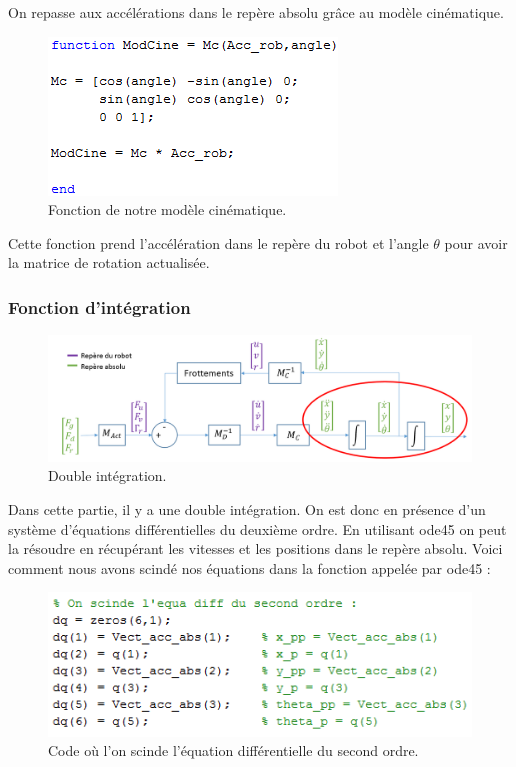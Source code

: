 \documentclass[a4paper,10pt]{article}
\begin{document}
On repasse aux accélérations dans le repère absolu grâce au modèle cinématique. 

\begin{figure}[H]
\bigcenter\includegraphics[scale=0.8]{images/cinematique.png}
\caption{Fonction de notre modèle cinématique.}
\end{figure}

Cette fonction prend l’accélération dans le repère du robot et l’angle $\theta$ pour avoir la matrice de rotation actualisée.

\subsubsection{Fonction d'intégration}
\begin{figure}[H]
\bigcenter\includegraphics[scale=0.5]{images/integration.png}
\caption{Double intégration.}
\end{figure}

Dans cette partie, il y a une double intégration. On est donc en présence d’un système d’équations différentielles du deuxième ordre. En utilisant ode45 on peut la résoudre en récupérant les vitesses et les positions dans le repère absolu. Voici comment nous avons scindé nos équations dans la fonction appelée par ode45 :

\begin{figure}[H]
\bigcenter\includegraphics[scale=0.8]{images/double_integration.png}
\caption{Code où l'on scinde l'équation différentielle du second ordre.}
\end{figure}
\end{document}
